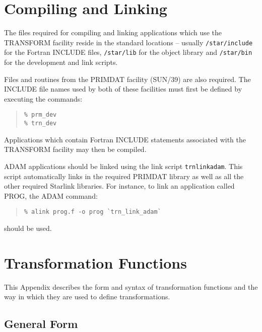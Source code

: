\documentclass[twoside,11pt]{article}
\newcommand{\xref}[3]{#1}
\newcommand{\xlabel}[1]{}
\renewcommand{\_}{\texttt{\symbol{95}}}
\newcommand{\name}[1]{\mbox{\small{#1}}}
\begin{document}
\section{\xlabel{compiling_and_linking}Compiling and Linking}

The files required for compiling and linking applications which use the
\name{TRANSFORM} facility reside in the standard locations -- usually
\texttt{/star/include} for the Fortran \name{INCLUDE} files,
\texttt{/star/lib} for the object library and \texttt{/star/bin} for the
development and link scripts.

Files and routines from the \name{PRIMDAT} facility (\xref{SUN/39}{sun39}{})
are also required.
The \name{INCLUDE} file names used by both of these facilities must first
be defined by executing the commands:

\begin{quote}
\begin{verbatim}
% prm_dev
% trn_dev
\end{verbatim}
\end{quote}

Applications which contain Fortran \name{INCLUDE} statements associated with
the \name{TRANSFORM} facility may then be compiled.

ADAM applications should be linked using the link script
\texttt{trn\_link\_adam}.
This script automatically links in the required \name{PRIMDAT} library as
well as all the other required Starlink libraries.
For instance, to link an application called \name{PROG}, the \name{ADAM}
command:

\begin{quote}
\begin{verbatim}
% alink prog.f -o prog `trn_link_adam`
\end{verbatim}
\end{quote}

should be used.

\cleardoublepage
\appendix

\section{\xlabel{appendix_transformation_functions}Transformation Functions}

\label{appendix_syntax}

This Appendix describes the form and syntax of transformation functions and
the way in which they are used to define transformations.


\subsection{\xlabel{general_form}General Form}
\end{document}
